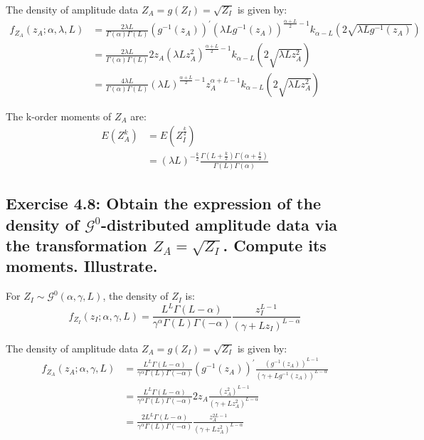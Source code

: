 \documentclass[conference,onecolumn]{IEEEtran}
\begin{document}
The density of amplitude data $Z_A = g(Z_I)=\sqrt{Z_I}$ is given by:
\begin{equation}
\begin{split}
f_{Z_A}(z_A;\alpha,\lambda,L) &= \frac{2\lambda L}{\Gamma(\alpha)\Gamma(L)} (g^{-1}(z_A))^{'} (\lambda L g^{-1}(z_A))^{\frac{\alpha+L}{2}-1} k_{\alpha-L}(2\sqrt{\lambda L g^{-1}(z_A)})  \\
&= \frac{2\lambda L}{\Gamma(\alpha)\Gamma(L)} 2z_A (\lambda L z_A^2)^{\frac{\alpha+L}{2}-1} k_{\alpha-L}(2\sqrt{\lambda L z_A^2}) \\
&=  \frac{4\lambda L}{\Gamma(\alpha)\Gamma(L)} (\lambda L)^{\frac{\alpha+L}{2}-1} z_A^{\alpha+L-1} k_{\alpha-L}(2\sqrt{\lambda L z_A^2})
\end{split}
\label{eq:ZA_K_dis}
\end{equation}

The k-order moments of $Z_A$ are:
\begin{equation}
\begin{split}
E(Z_A^k) &= E(Z_I^{\frac{k}{2}}) \\
&= (\lambda L)^{-\frac{k}{2}} \frac{\Gamma(L+\frac{k}{2})\Gamma(\alpha+\frac{k}{2})}{\Gamma(L)\Gamma(\alpha)}
\end{split}
\label{eq:Moment_ZA_k_dis}
\end{equation}


\subsection{Exercise 4.8: Obtain the expression of the density of $\mathcal G^0$-distributed amplitude data via the transformation $Z_A=\sqrt{Z_I}$. Compute its moments. Illustrate.} 

For $Z_I \sim \mathcal G^0(\alpha,\gamma,L)$, the density of $Z_I$ is:
\begin{equation}
f_{Z_I}(z_I;\alpha,\gamma,L) = \frac{L^L \Gamma(L-\alpha)}{\gamma^\alpha \Gamma(L)\Gamma(-\alpha)} \frac{z_I^{L-1}}{(\gamma+L z_I)^{L-\alpha}}
\label{eq:ZI_G0_dis}
\end{equation}

The density of amplitude data $Z_A = g(Z_I)=\sqrt{Z_I}$ is given by:
\begin{equation}
\begin{split}
f_{Z_A}(z_A;\alpha,\gamma,L) &= \frac{L^L \Gamma(L-\alpha)}{\gamma^\alpha \Gamma(L)\Gamma(-\alpha)} (g^{-1}(z_A))^{'} \frac{(g^{-1}(z_A))^{L-1}}{(\gamma+L g^{-1}(z_A))^{L-\alpha}} \\
&= \frac{L^L \Gamma(L-\alpha)}{\gamma^\alpha \Gamma(L)\Gamma(-\alpha)} 2z_A \frac{(z_A^2)^{L-1}}{(\gamma+L z_A^2)^{L-\alpha}} \\
&= \frac{2L^L \Gamma(L-\alpha)}{\gamma^\alpha \Gamma(L)\Gamma(-\alpha)} \frac{z_A^{2L-1}}{(\gamma+L z_A^2)^{L-\alpha}}
\end{split}
\label{eq:ZA_G0_dis}
\end{equation}
\end{document}

